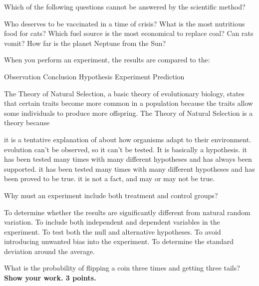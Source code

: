 
\question
Which of the following questions cannot be answered by the scientific method?

\begin{choices}
\correctchoice Who deserves to be vaccinated in a time of crisis?
\choice What is the most nutritious food for cats?
\choice Which fuel source is the most economical to replace coal?
\choice Can rats vomit?
\choice How far is the planet Neptune from the Sun?
\end{choices}

\question
When you perform an experiment, the results are compared to the:

\begin{choices}
\choice Observation 
\choice Conclusion
\choice Hypothesis
\choice Experiment
\correctchoice Prediction
\end{choices}

\question
The Theory of Natural Selection, a basic theory of evolutionary biology, states that certain traits become more common in a population because the traits allow some individuals to produce more offspring. The Theory of Natural Selection is a theory because

\begin{choices}
\choice it is a tentative explanation of about how organisms adapt to their environment.
\choice evolution can't be observed, so it can't be tested. It is basically a hypothesis.
\correctchoice it has been tested many times with many different hypotheses and has always been supported.
\choice it has been tested many times with many different hypotheses and has been proved to be true.
\choice it is not a fact, and may or may not be true.
\end{choices}

\question
Why must an experiment include both treatment and control groups?

\begin{choices}
\correctchoice To determine whether the results are significantly different from natural random variation.
\choice To include both independent and dependent variables in the experiment.
\choice To test both the null and alternative hypotheses.
\choice To avoid introducing unwanted bias into the experiment.
\choice To determine the standard deviation around the average.
\end{choices}

\question
What is the probability of flipping a coin three times and getting three tails? \textbf{Show your work. 3 points.}

